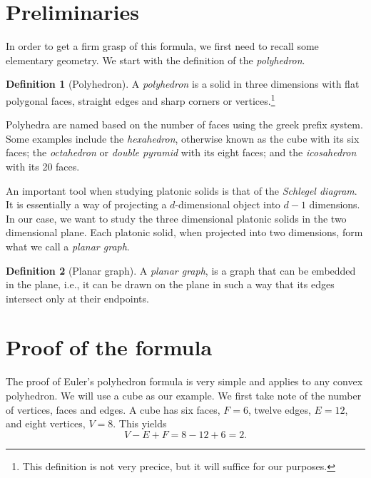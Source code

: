 \documentclass{amsart}
\theoremstyle{plain}
\theoremstyle{definition}
\newtheorem{definition}{Definition}
\begin{document}
\section{Preliminaries}
\label{sec:preliminaries}

In order to get a firm grasp of this formula, we first need to recall some
elementary geometry.  We start with the definition of the \emph{polyhedron}.

\begin{definition}[Polyhedron]
    A \emph{polyhedron} is a solid in three dimensions with flat polygonal
    faces, straight edges and sharp corners or vertices.\footnote{This
    definition is not very precice, but it will suffice for our purposes.}
\end{definition}

Polyhedra are named based on the number of faces using the greek prefix system.
Some examples include the \emph{hexahedron}, otherwise known as the cube with
its six faces; the \emph{octahedron} or \emph{double pyramid} with its eight
faces; and the \emph{icosahedron} with its 20 faces.

An important tool when studying platonic solids is that of the \emph{Schlegel
diagram}. It is essentially a way of projecting a $d$-dimensional object into
$d-1$ dimensions. In our case, we want to study the three dimensional platonic
solids in the two dimensional plane. Each platonic solid, when projected into
two dimensions, form what we call a \emph{planar graph}.

\begin{definition}[Planar graph]
  A \emph{planar graph}, is a graph that can be embedded in the plane, i.e., it
  can be drawn on the plane in such a way that its edges intersect only at
  their endpoints.
\end{definition}

\section{Proof of the formula}
\label{sec:proof_of_the_formula}

The proof of Euler's polyhedron formula is very simple and applies to any
convex polyhedron. We will use a cube as our example. We first take note of the
number of vertices, faces and edges. A cube has six faces, $F = 6$, twelve
edges, $E = 12$, and eight vertices, $V = 8$. This yields
\begin{equation}
    \label{eq:form}
    V - E + F = 8 - 12 + 6 = 2.
\end{equation}
\end{document}
